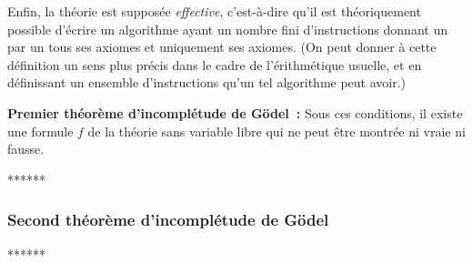 Enfin, la théorie est supposée \textit{effective}, c'est-à-dire qu'il est théoriquement possible d'écrire un algorithme ayant un nombre fini d'instructions donnant un par un tous ses axiomes et uniquement ses axiomes. 
(On peut donner à cette définition un sens plus précis dans le cadre de l'érithmétique usuelle, et en définissant un ensemble d'instructions qu'un tel algorithme peut avoir.)

\medskip

\noindent \textbf{Premier théorème d'incomplétude de Gödel :} Sous ces conditions, il existe une formule $f$ de la théorie sans variable libre qui ne peut être montrée ni vraie ni fausse.

\medskip

******

\subsubsection{Second théorème d'incomplétude de Gödel}


******
